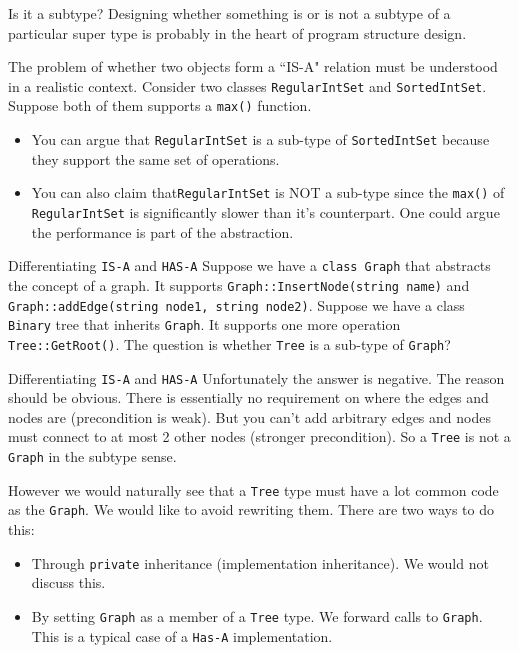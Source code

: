\begin{frame}{Is it a subtype?}
Designing whether something is or is not a subtype of a particular super type is probably in the heart of program structure design.


The problem of whether two objects form a ``IS-A" relation must be understood in a realistic context. Consider two classes \texttt{RegularIntSet} and \texttt{SortedIntSet}. Suppose both of them supports a \texttt{max()} function.
\begin{itemize}
	\item You can argue that \texttt{RegularIntSet} is a sub-type of \texttt{SortedIntSet} because they support the same set of operations.
	\item You can also claim that\texttt{RegularIntSet} is NOT a sub-type since the \texttt{max()} of \texttt{RegularIntSet} is significantly slower than it's counterpart. One could argue the performance is part of the abstraction.
\end{itemize}
\end{frame}


\begin{frame}{Differentiating \texttt{IS-A} and \texttt{HAS-A}}
Suppose we have a \texttt{class Graph} that abstracts the concept of a graph. It supports \texttt{Graph::InsertNode(string name)} and \texttt{Graph::addEdge(string node1, string node2)}. Suppose we have a class \texttt{Binary} tree that inherits \texttt{Graph}. It supports one more operation \texttt{Tree::GetRoot()}. The question is whether \texttt{Tree} is a sub-type of \texttt{Graph}?
\end{frame}

\begin{frame}{Differentiating \texttt{IS-A} and \texttt{HAS-A}}
Unfortunately the answer is negative. The reason should be obvious. There is essentially no requirement on where the edges and nodes are (precondition is weak). But you can't add arbitrary edges and nodes must connect to at most 2 other nodes (stronger precondition). \alert{So a \texttt{Tree} is not a  \texttt{Graph} in the subtype sense}.

\vspace{0.1in}
However we would naturally see that a \texttt{Tree} type must have a lot common code as the \texttt{Graph}. We would like to avoid rewriting them. There are two ways to do this:
\begin{itemize}
	\item Through \texttt{private} inheritance (implementation inheritance). We would not discuss this.
	\item By setting \texttt{Graph} as a member of a \texttt{Tree} type. We forward calls to \texttt{Graph}. This is a typical case of a \texttt{Has-A} implementation.
\end{itemize} 
\end{frame}